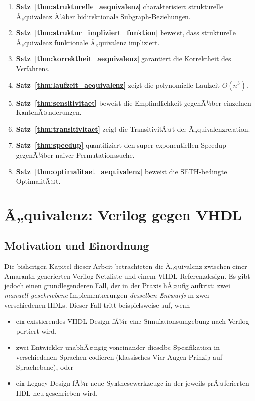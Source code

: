 ﻿\documentclass[12pt,a4paper]{report}
\begin{document}
\begin{enumerate}
    \item \textbf{Satz~\ref{thm:strukturelle_aequivalenz}} charakterisiert strukturelle Ã„quivalenz Ã¼ber bidirektionale Subgraph-Beziehungen.
    \item \textbf{Satz~\ref{thm:struktur_impliziert_funktion}} beweist, dass strukturelle Ã„quivalenz funktionale Ã„quivalenz impliziert.
    \item \textbf{Satz~\ref{thm:korrektheit_aequivalenz}} garantiert die Korrektheit des Verfahrens.
    \item \textbf{Satz~\ref{thm:laufzeit_aequivalenz}} zeigt die polynomielle Laufzeit $O(n^3)$.
    \item \textbf{Satz~\ref{thm:sensitivitaet}} beweist die Empfindlichkeit gegenÃ¼ber einzelnen KantenÃ¤nderungen.
    \item \textbf{Satz~\ref{thm:transitivitaet}} zeigt die TransitivitÃ¤t der Ã„quivalenzrelation.
    \item \textbf{Satz~\ref{thm:speedup}} quantifiziert den super-exponentiellen Speedup gegenÃ¼ber naiver Permutationssuche.
    \item \textbf{Satz~\ref{thm:optimalitaet_aequivalenz}} beweist die SETH-bedingte OptimalitÃ¤t.
\end{enumerate}

\chapter{Ã„quivalenz: Verilog gegen VHDL}
\label{sec:verilog_vhdl_direkt}

\section{Motivation und Einordnung}

Die bisherigen Kapitel dieser Arbeit betrachteten die Ã„quivalenz zwischen einer
Amaranth-generierten Verilog-Netzliste und einem VHDL-Referenzdesign.  Es gibt
jedoch einen grundlegenderen Fall, der in der Praxis hÃ¤ufig auftritt: zwei
\emph{manuell geschriebene} Implementierungen \emph{desselben Entwurfs} in zwei
verschiedenen HDLs.  Dieser Fall tritt beispielsweise auf, wenn

\begin{itemize}
	\item ein existierendes VHDL-Design fÃ¼r eine Simulationsumgebung nach Verilog
	portiert wird,
	\item zwei Entwickler unabhÃ¤ngig voneinander dieselbe Spezifikation in
	verschiedenen Sprachen codieren (klassisches Vier-Augen-Prinzip auf
	Sprach\-ebene), oder
	\item ein Legacy-Design fÃ¼r neue Synthesewerkzeuge in der jeweils prÃ¤ferierten
	HDL neu geschrieben wird.
\end{itemize}
\end{document}
